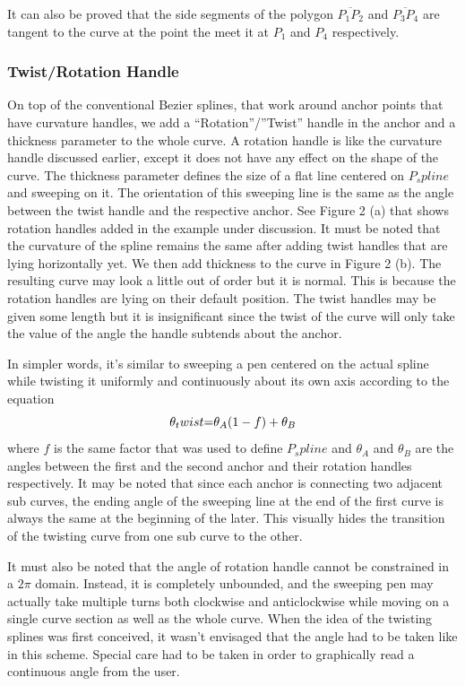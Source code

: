 It can also be proved that the side segments of the polygon $\overline{P_1 P_2}$ and $\overline{P_3 P_4}$ are tangent to the curve at the point the meet it at $P_1$ and $P_4$ respectively.


\subsubsection{Twist/Rotation Handle}
    On top of the conventional Bezier splines, that work around anchor points that have curvature handles, we add a “Rotation”/”Twist” handle in the anchor and a thickness parameter to the whole curve. A rotation handle is like the curvature handle discussed earlier, except it does not have any effect on the shape of the curve. The thickness parameter defines the size of a flat line centered on $P_spline$ and sweeping on it. The orientation of this sweeping line is the same as the angle between the twist handle and the respective anchor. See Figure 2 (a) that shows rotation handles added in the example under discussion. It must be noted that the curvature of the spline remains the same after adding twist handles that are lying horizontally yet. We then add thickness to the curve in Figure 2 (b). The resulting curve may look a little out of order but it is normal. This is because the rotation handles are lying on their default position. The twist handles may be given some length but it is insignificant since the twist of the curve will only take the value of the angle the handle subtends about the anchor.

    In simpler words, it’s similar to sweeping a pen centered on the actual spline while twisting it uniformly and continuously about its own axis according to the equation
    \begin{equation}
    \theta_twist$$=$$\theta_A  (1-f)+ \theta_B
    \end{equation}
    where $f$ is the same factor that was used to define $P_spline$ and $\theta_A$ and $\theta_B$ are the angles between the first and the second anchor and their rotation handles respectively. It may be noted that since each anchor is connecting two adjacent sub curves, the ending angle of the sweeping line at the end of the first curve is always the same at the beginning of the later. This visually hides the transition of the twisting curve from one sub curve to the other.

    It must also be noted that the angle of rotation handle cannot be constrained in a $2\pi$ domain. Instead, it is completely unbounded, and the sweeping pen may actually take multiple turns both clockwise and anticlockwise while moving on a single curve section as well as the whole curve. When the idea of the twisting splines was first conceived, it wasn’t envisaged that the angle had to be taken like in this scheme. Special care had to be taken in order to graphically read a continuous angle from the user.

